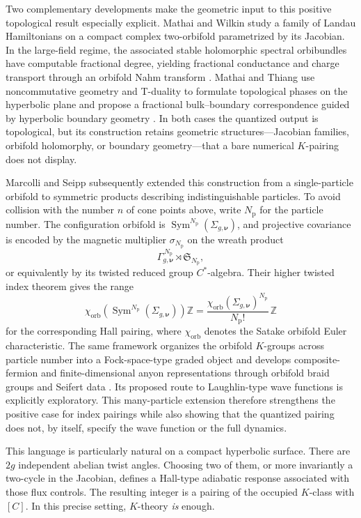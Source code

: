 \documentclass[11pt]{article}
\theoremstyle{definition}
\theoremstyle{remark}
\newcommand{\ZZ}{\mathbb Z}
\begin{document}
Two complementary developments make the geometric input to this positive
topological result especially explicit.  Mathai and Wilkin study a family of
Landau Hamiltonians on a compact complex two-orbifold parametrized by its
Jacobian.  In the large-field regime, the associated stable holomorphic
spectral orbibundles have computable fractional degree, yielding fractional
conductance and charge transport through an orbifold Nahm transform
\cite{MathaiWilkin2019}.  Mathai and Thiang use noncommutative geometry and
T-duality to formulate topological phases on the hyperbolic plane and propose
a fractional bulk--boundary correspondence guided by hyperbolic boundary
geometry \cite{MathaiThiang2019}.  In both cases the quantized output is
topological, but its construction retains geometric structures---Jacobian
families, orbifold holomorphy, or boundary geometry---that a bare numerical
\(K\)-pairing does not display.

Marcolli and Seipp subsequently extended this construction from a
single-particle orbifold to symmetric products describing indistinguishable
particles.  To avoid collision with the number \(n\) of cone points above,
write \(N_{\mathrm p}\) for the particle number.  The configuration orbifold
is
\(\operatorname{Sym}^{N_{\mathrm p}}(\Sigma_{g,\bm\nu})\), and projective
covariance is encoded by the magnetic multiplier \(\sigma_{N_{\mathrm p}}\)
on the wreath product
\[
 \Gamma_{g,\bm\nu}^{\,N_{\mathrm p}}\rtimes
       \mathfrak S_{N_{\mathrm p}},
\]
or equivalently by its twisted reduced group \(C^*\)-algebra.  Their higher
twisted index theorem gives the range
\[
 \chi_{\mathrm{orb}}\!\left(
       \operatorname{Sym}^{N_{\mathrm p}}(\Sigma_{g,\bm\nu})\right)\ZZ
   =
 \frac{\chi_{\mathrm{orb}}(\Sigma_{g,\bm\nu})^{N_{\mathrm p}}}
      {N_{\mathrm p}!}\,\ZZ
\]
for the corresponding Hall pairing, where \(\chi_{\mathrm{orb}}\) denotes
the Satake orbifold Euler characteristic.  The same framework organizes the
orbifold \(K\)-groups across particle number into a Fock-space-type graded
object and develops composite-fermion and finite-dimensional anyon
representations through orbifold braid groups and Seifert data
\cite{MarcolliSeipp2017}.  Its proposed route to Laughlin-type wave functions
is explicitly exploratory.  This many-particle extension therefore
strengthens the positive case for index pairings while also showing that the
quantized pairing does not, by itself, specify the wave function or the full
dynamics.

This language is particularly natural on a compact hyperbolic surface.
There are \(2g\) independent abelian twist angles.  Choosing two of them, or
more invariantly a two-cycle in the Jacobian, defines a Hall-type adiabatic
response associated with those flux controls.  The resulting integer is a
pairing of the occupied \(K\)-class with \([C]\).  In this precise setting,
\(K\)-theory \emph{is} enough.
\end{document}
